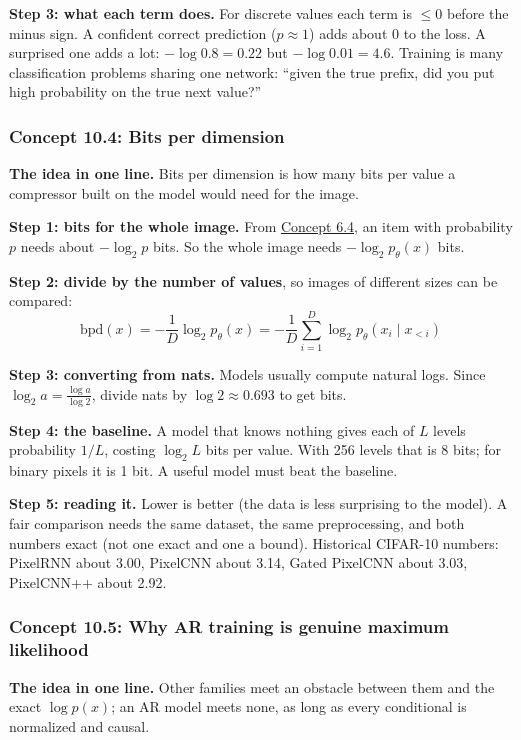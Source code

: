 \documentclass[12pt,a4paper]{article}
\begin{document}
\textbf{Step 3: what each term does.} For discrete values each term is $\le0$ before the minus sign. A confident correct prediction ($p\approx1$) adds about 0 to the loss. A surprised one adds a lot: $-\log0.8=0.22$ but $-\log0.01=4.6$. Training is many classification problems sharing one network: ``given the true prefix, did you put high probability on the true next value?''

\subsubsection{Concept 10.4: Bits per dimension}\label{c10-4}

\textbf{The idea in one line.} Bits per dimension is how many bits per value a compressor built on the model would need for the image.

\textbf{Step 1: bits for the whole image.} From \hyperref[c6-4]{Concept 6.4}, an item with probability $p$ needs about $-\log_2p$ bits. So the whole image needs $-\log_2p_\theta(x)$ bits.

\textbf{Step 2: divide by the number of values}, so images of different sizes can be compared:
\[
\text{bpd}(x)=-\frac{1}{D}\log_2 p_\theta(x)=-\frac1D\sum_{i=1}^{D}\log_2 p_\theta(x_i\mid x_{<i})
\]

\textbf{Step 3: converting from nats.} Models usually compute natural logs. Since $\log_2a=\frac{\log a}{\log2}$, divide nats by $\log2\approx0.693$ to get bits.

\textbf{Step 4: the baseline.} A model that knows nothing gives each of $L$ levels probability $1/L$, costing $\log_2L$ bits per value. With 256 levels that is 8 bits; for binary pixels it is 1 bit. A useful model must beat the baseline.

\textbf{Step 5: reading it.} Lower is better (the data is less surprising to the model). A fair comparison needs the same dataset, the same preprocessing, and both numbers exact (not one exact and one a bound). Historical CIFAR-10 numbers: PixelRNN about 3.00, PixelCNN about 3.14, Gated PixelCNN about 3.03, PixelCNN++ about 2.92.

\subsubsection{Concept 10.5: Why AR training is genuine maximum likelihood}\label{c10-5}

\textbf{The idea in one line.} Other families meet an obstacle between them and the exact $\log p(x)$; an AR model meets none, as long as every conditional is normalized and causal.
\end{document}
